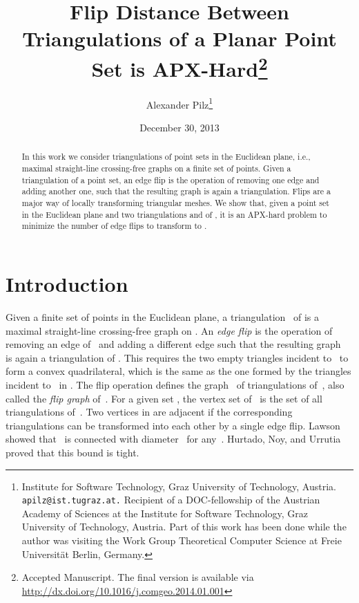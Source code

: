 \documentclass[11pt,a4paper]{article}
\title{Flip Distance Between Triangulations of a Planar Point Set is APX-Hard\thanks{Accepted Manuscript. The final version is available via \protect\url{http://dx.doi.org/10.1016/j.comgeo.2014.01.001}}}
\author{Alexander Pilz\thanks{\ifarxiv
Institute for Software Technology, Graz University of Technology, Austria.
\texttt{apilz@ist.tugraz.at.}
\else
\fi
Recipient of a DOC-fellowship of the Austrian Academy of Sciences at the Institute for Software Technology, Graz University of Technology, Austria. Part of this work has been done while the author was visiting the Work Group Theoretical Computer Science at Freie Universit\"at Berlin, Germany.}}
\date{December 30, 2013}
\begin{document}
\maketitle

\begin{abstract}
In this work we consider triangulations of point sets in the Euclidean plane, i.e., maximal straight-line crossing-free graphs on a finite set of points.
Given a triangulation of a point set, an edge flip is the operation of removing one edge and adding another one, such that the resulting graph is again a triangulation.
Flips are a major way of locally transforming triangular meshes.
We show that, given a point set  in the Euclidean plane and two triangulations  and  of ,
it is an APX-hard problem to minimize the number of edge flips to transform  to .
\end{abstract}

\section{Introduction}
Given a finite set  of  points in the Euclidean plane, a triangulation~ of  is a maximal straight-line crossing-free graph on .
An \emph{edge flip} is the operation of removing an edge  of~ and adding a different edge  such that the resulting graph~ is again a triangulation of .
This requires the two empty triangles incident to~ to form a convex quadrilateral, which is the same as the one formed by the triangles incident to~ in .
The flip operation defines the graph~ of triangulations of~, also called the \emph{flip graph} of~.
For a given set , the vertex set of~ is the set of all triangulations of~.
Two vertices in  are adjacent if the corresponding triangulations can be transformed into each other by a single edge flip.
Lawson~\cite{lawson_connected} showed that~ is connected with diameter~ for any~.
Hurtado, Noy, and Urrutia~\cite{hurtado_noy_urrutia} proved that this bound is tight.
\end{document}
